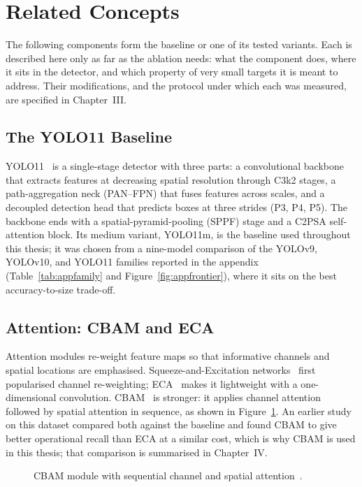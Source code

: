 \section{Related Concepts}
The following components form the baseline or one of its tested variants. Each
is described here only as far as the ablation needs: what the component does,
where it sits in the detector, and which property of very small targets it is
meant to address. Their modifications, and the protocol under which each was
measured, are specified in Chapter~III.

\subsection{The YOLO11 Baseline}
YOLO11~\cite{jocher2024yolo11} is a single-stage detector with three parts: a
convolutional backbone that extracts features at decreasing spatial resolution
through C3k2 stages, a path-aggregation neck (PAN--FPN) that fuses features across
scales, and a decoupled detection head that predicts boxes at three strides (P3,
P4, P5). The backbone ends with a spatial-pyramid-pooling (SPPF) stage and a
C2PSA self-attention block. Its medium variant, YOLO11m, is the baseline used
throughout this thesis; it was chosen from a nine-model comparison of the
YOLOv9, YOLOv10, and YOLO11 families reported in the appendix
(Table~\ref{tab:appfamily} and Figure~\ref{fig:appfrontier}), where it sits on
the best accuracy-to-size trade-off.

\subsection{Attention: CBAM and ECA}
Attention modules re-weight feature maps so that informative channels and spatial
locations are emphasised. Squeeze-and-Excitation networks~\cite{hu2018senet} first
popularised channel re-weighting; ECA~\cite{wang2020eca} makes it lightweight with a
one-dimensional convolution. CBAM~\cite{woo2018cbam} is stronger:
it applies channel attention followed by spatial attention in sequence, as shown in
Figure~\ref{fig:cbam}. An earlier study on this dataset compared both against the
baseline and found CBAM to give better operational recall than ECA at a similar
cost, which is why CBAM is used in this thesis; that comparison is summarised in
Chapter~IV.

\begin{figure}[tbp]
  \centering
  \caption{CBAM module with sequential channel and spatial attention~\cite{woo2018cbam}.}
  \label{fig:cbam}
\end{figure}

